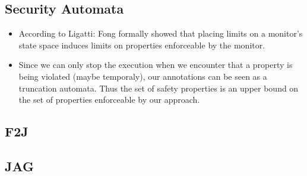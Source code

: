 \documentclass[a4paper,10pt]{article}
\theoremstyle{definition}
\begin{document}
\subsection*{Security Automata}
\begin{itemize}
  \item According to  Ligatti:  Fong formally showed that placing limits on a
monitor's state space induces limits on properties enforceable by the monitor.
  \item Since we can only stop the execution when we encounter that a property
is being violated (maybe temporaly), our annotations can be seen as a
truncation automata. Thus the set of safety properties is an upper bound on the
set of properties enforceable by our approach.
\end{itemize}

\subsection*{F2J}

\subsection*{JAG}
\end{document}
